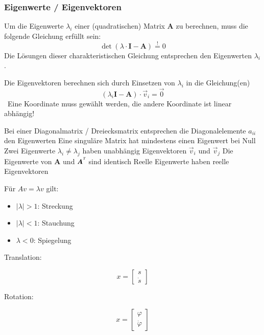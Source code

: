 \subsubsection{Eigenwerte / Eigenvektoren}

Um die Eigenwerte $\lambda_i$ einer (quadratischen) Matrix $\bm{A}$ zu berechnen, muss die folgende Gleichung erfüllt sein:
$$ \det(\lambda \cdot \bm{I} - \bm{A}) \overset{!}{=} 0 $$
Die Lösungen dieser charakteristischen Gleichung entsprechen den Eigenwerten $\lambda_i$.

\smallskip

Die Eigenvektoren berechnen sich durch Einsetzen von $\lambda_i$ in die Gleichung(en)
$$ (\lambda_i \bm{I} - \bm{A}) \cdot \vec{v}_i = \vec{0} $$
\textrightarrow\ Eine Koordinate muss gewählt werden, die andere Koordinate ist linear abhängig!

\medskip



\begin{outline}
    \1 Bei einer Diagonalmatrix / Dreiecksmatrix entsprechen die Diagonalelemente $a_{ii}$ den Eigenwerten
    \1 Eine singuläre Matrix hat mindestens einen Eigenwert bei Null
    \1 Zwei Eigenwerte $\lambda_i \neq \lambda_j$ haben unabhängig Eigenvektoren $\vec{v}_i$ und $\vec{v}_j$
    \1 Die Eigenwerte von $\bm{A}$ und $\bm{A^{\tps}}$ sind identisch
    \1 Reelle Eigenwerte haben reelle Eigenvektoren
\end{outline}
Für $A v = \lambda v$ gilt:
\begin{itemize}
\item $|\lambda| > 1$: Streckung
\item $|\lambda| < 1$: Stauchung
\item $\lambda < 0$: Spiegelung
\end{itemize}


Translation:

\[
    x=
    \begin{bmatrix}
        s\\
        \dot s
    \end{bmatrix}
\]

Rotation:

\[
    x=
    \begin{bmatrix}
        \varphi\\
        \dot\varphi
    \end{bmatrix}
\]

